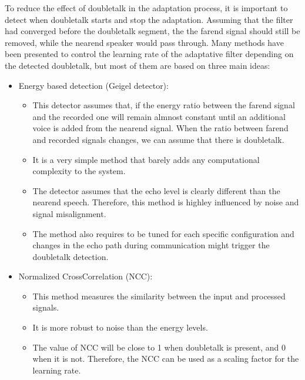 \documentclass[letterpaper,10pt,english]{jupyterBook}
\begin{document}
\sphinxAtStartPar
To reduce the effect of double\sphinxhyphen{}talk in the adaptation process, it is
important to detect when double\sphinxhyphen{}talk starts and stop the adaptation.
Assuming that the filter had converged before the double\sphinxhyphen{}talk segment,
the the far\sphinxhyphen{}end signal should still be removed, while the near\sphinxhyphen{}end
speaker would pass through. Many methods have been presented to control
the learning rate of the adaptative filter depending on the detected
double\sphinxhyphen{}talk, but most of them are based on three main ideas:
\begin{itemize}
\item {} 
\sphinxAtStartPar
Energy based detection (Geigel detector):
\begin{itemize}
\item {} 
\sphinxAtStartPar
This detector assumes that, if the energy ratio between the
far\sphinxhyphen{}end signal and the recorded one will remain almnost constant
until an additional voice is added from the near\sphinxhyphen{}end signal.
When the ratio between far\sphinxhyphen{}end and recorded signals changes, we
can assume that there is double\sphinxhyphen{}talk.

\item {} 
\sphinxAtStartPar
It is a very simple method that barely adds any computational
complexity to the system.

\item {} 
\sphinxAtStartPar
The detector assumes that the echo level is clearly different
than the near\sphinxhyphen{}end speech. Therefore, this method is highley
influenced by noise and signal misalignment.

\item {} 
\sphinxAtStartPar
The method also requires to be tuned for each specific
configuration and changes in the echo path during communication
might trigger the double\sphinxhyphen{}talk detection.

\end{itemize}

\item {} 
\sphinxAtStartPar
Normalized Cross\sphinxhyphen{}Correlation (NCC):
\begin{itemize}
\item {} 
\sphinxAtStartPar
This method measures the similarity between the input and
processed signals.

\item {} 
\sphinxAtStartPar
It is more robust to noise than the energy levels.

\item {} 
\sphinxAtStartPar
The value of NCC will be close to 1 when double\sphinxhyphen{}talk is present,
and 0 when it is not. Therefore, the NCC can be used as a
scaling factor for the learning rate.

\end{itemize}

\end{itemize}
\end{document}

